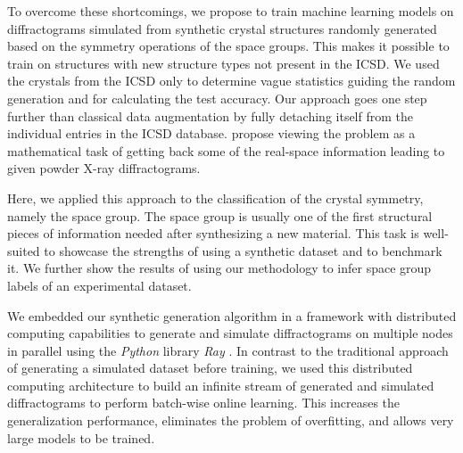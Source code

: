 To overcome these shortcomings, we propose to train machine learning models on
diffractograms simulated from synthetic crystal structures randomly generated
based on the symmetry operations of the space groups. This makes it possible to
train on structures with new structure types not present in the ICSD. We used
the crystals from the ICSD only to determine vague statistics guiding the random
generation and for calculating the test accuracy. Our approach goes one step
further than classical data augmentation by fully detaching itself from the
individual entries in the ICSD database.
  propose viewing the problem
 as a mathematical task of getting back some of the real-space information
leading to given powder X-ray diffractograms. 

Here, we applied this approach to the classification of the crystal symmetry,
namely the space group. The space group is usually one of the first structural
pieces of information needed after synthesizing a new material. This task is
well-suited to showcase the strengths of using a synthetic dataset and to
benchmark it. We further show the results of using our methodology to infer space group labels of an experimental dataset.

We embedded our synthetic generation algorithm in a framework with
distributed computing capabilities to generate and simulate diffractograms on
multiple nodes in parallel using the \emph{Python} library \emph{Ray}
\supercite{moritzRayDistributedFramework2018a}. In contrast to the traditional
approach of generating a simulated dataset before training, we used this
distributed computing architecture to build an infinite stream of 
generated and simulated diffractograms to perform batch-wise online learning.
This increases the generalization performance, eliminates the problem of
overfitting, and allows very large models to be trained.



